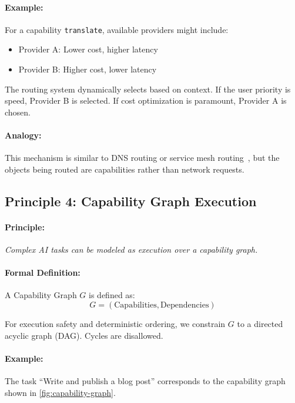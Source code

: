 \paragraph{Example:}
For a capability \texttt{translate}, available providers might include:
\begin{itemize}[leftmargin=*,nosep]
  \item Provider A: Lower cost, higher latency
  \item Provider B: Higher cost, lower latency
\end{itemize}

The routing system dynamically selects based on context. If the user priority is speed, Provider B is selected. If cost optimization is paramount, Provider A is chosen.

\paragraph{Analogy:}
This mechanism is similar to DNS routing or service mesh routing~\cite{consul_service_mesh}, but the objects being routed are capabilities rather than network requests.

\subsection{Principle 4: Capability Graph Execution}

\paragraph{Principle:}
\emph{Complex AI tasks can be modeled as execution over a capability graph.}

\paragraph{Formal Definition:}
A Capability Graph $G$ is defined as:
\begin{equation}
G = (\mathrm{Capabilities}, \mathrm{Dependencies})
\label{eq:capability-graph}
\end{equation}

For execution safety and deterministic ordering, we constrain $G$ to a directed acyclic graph (DAG). Cycles are disallowed.

\paragraph{Example:}
The task ``Write and publish a blog post'' corresponds to the capability graph shown in \cref{fig:capability-graph}.


